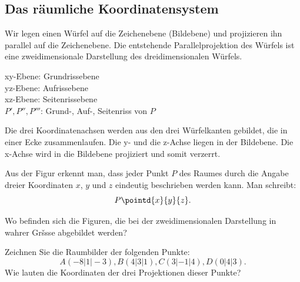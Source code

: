 \documentclass[%
11pt,%
twoside,%
titlepage,%
a4page,%
german,%
headsepline%
]{scrartcl}
\begin{document}
\subsection{Das r\"aumliche Koordinatensystem}
Wir legen einen W\"urfel auf die Zeichenebene (Bildebene) und projizieren ihn parallel auf die Zeichenebene. Die entstehende Parallelprojektion des W\"urfels ist eine zweidimensionale Darstellung des dreidimensionalen W\"urfels.
\begin{center}

xy-Ebene: Grundrissebene\\
yz-Ebene: Aufrissebene\\
xz-Ebene: Seitenrissebene\\
$P', P'', P'''$: Grund-, Auf-, Seitenriss von $P$
\end{center}
Die drei Koordinatenachsen werden aus den drei W\"urfelkanten gebildet, die in einer Ecke zusammenlaufen. Die y- und die z-Achse liegen in der Bildebene. Die x-Achse wird in die Bildebene projiziert und somit verzerrt.

Aus der Figur erkennt man, dass jeder Punkt $P$ des Raumes durch die Angabe dreier Koordinaten $x$, $y$ und $z$ eindeutig beschrieben werden kann. Man schreibt:
$$P\pointd{x}{y}{z}.$$

\begin{ueb}
Wo befinden sich die Figuren, die bei der zweidimensionalen Darstellung in wahrer Gršsse abgebildet werden?
\end{ueb}
\begin{ueb}
Zeichnen Sie die Raumbilder der folgenden Punkte:
$$A(-8|1|-3), B(4|3|1), C(3|-1|4), D(0|4|3).$$ Wie lauten die Koordinaten der drei Projektionen dieser Punkte?
\end{ueb}
\end{document}
